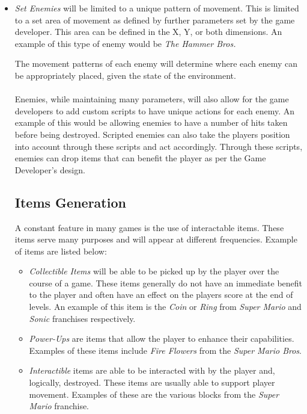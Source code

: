 \documentclass[pdftex,12pt,letter]{article}
\begin{document}
\begin{itemize}
\begin{itemize}
\item \textit{Set Enemies} will be limited to a unique pattern of movement. This is limited to a set area of movement as defined by further parameters set by the game developer. This area can be defined in the X, Y, or both dimensions. An example of this type of enemy would be \textit{The Hammer Bros.}\\

\endgroup

The movement patterns of each enemy will determine where each enemy can be appropriately placed, given the state of the environment. 
\\\\
Enemies, while maintaining many parameters, will also allow for the game developers to add custom scripts to have unique actions for each enemy. An example of this would be allowing enemies to have a number of hits taken before being destroyed. Scripted enemies can also take the players position into account through these scripts and act accordingly. Through these scripts, enemies can drop items that can benefit the player as per the Game Developer's design. 
\\

\subsection{Items Generation}
A constant feature in many games is the use of interactable items. These items serve many purposes and will appear at different frequencies. Example of items are listed below:
\begin{itemize}
\item \textit{Collectible Items} will be able to be picked up by the player over the course of a game. These items generally do not have an immediate benefit to the player and often have an effect on the players score at the end of levels. An example of this item is the \textit{Coin} or \textit{Ring} from \textit{Super Mario} and \textit{Sonic} franchises respectively. 

\item \textit{Power-Ups} are items that allow the player to enhance their capabilities. Examples of these items include \textit{Fire Flowers} from the \textit{Super Mario Bros}.

\item \textit{Interactible} items are able to be interacted with by the player and, logically, destroyed. These items are usually able to support player movement. Examples of these are the various blocks from the \textit{Super Mario} franchise. \\


\end{itemize}
\end{itemize}
\end{itemize}
\end{document}
